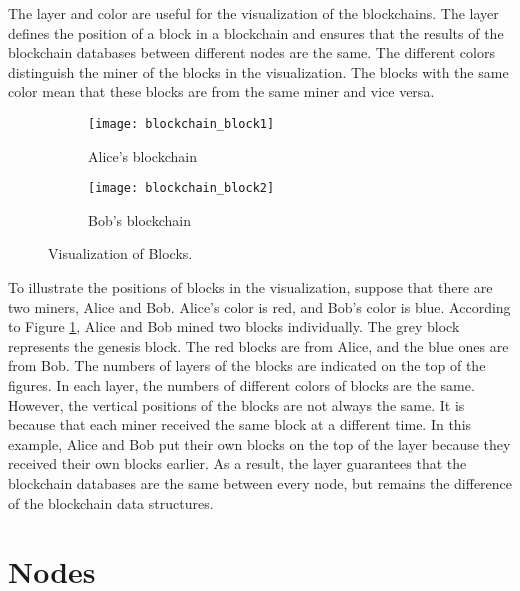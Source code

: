 The layer and color are useful for the visualization of the blockchains. The layer defines the position of a block in a blockchain and ensures that the results of the blockchain databases between different nodes are the same. The different colors distinguish the miner of the blocks in the visualization. The blocks with the same color mean that these blocks are from the same miner and vice versa.

\begin{figure}[htb]
    \centering
    \begin{subfigure}[b]{0.4\textwidth}
        \centering
        \texttt{[image: blockchain\_block1]}
        \caption{Alice's blockchain}
    \end{subfigure}
    \hfill
    \begin{subfigure}[b]{0.4\textwidth}
        \centering
        \texttt{[image: blockchain\_block2]}
        \caption{Bob's blockchain}
    \end{subfigure}

    \caption{Visualization of Blocks.}
    \label{fig:visualization of blocks}
\end{figure}

To illustrate the positions of blocks in the visualization, suppose that there are two miners, Alice and Bob. Alice's color is red, and Bob's color is blue. According to Figure \ref{fig:visualization of blocks}, Alice and Bob mined two blocks individually. The grey block represents the genesis block. The red blocks are from Alice, and the blue ones are from Bob. The numbers of layers of the blocks are indicated on the top of the figures. In each layer, the numbers of different colors of blocks are the same. However, the vertical positions of the blocks are not always the same. It is because that each miner received the same block at a different time. In this example, Alice and Bob put their own blocks on the top of the layer because they received their own blocks earlier. As a result, the layer guarantees that the blockchain databases are the same between every node, but remains the difference of the blockchain data structures.

\section{Nodes}

